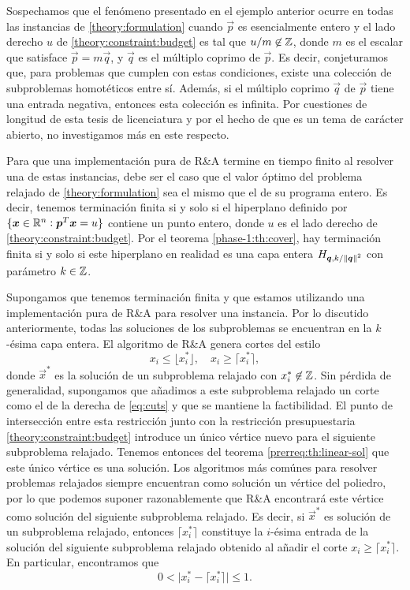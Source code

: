 Sospechamos que el fenómeno presentado en el ejemplo anterior ocurre en todas las instancias de
\eqref{theory:formulation} cuando $\vec{p}$ es esencialmente entero y el lado derecho $u$ de
\eqref{theory:constraint:budget} es tal que $u/m \not\in \mathbb{Z}$, donde $m$ es el escalar que satisface
$\vec{p} = m\vec{q}$, y $\vec{q}$ es el múltiplo coprimo de $\vec{p}$. Es decir, conjeturamos
que, para problemas que cumplen con estas condiciones, existe una colección de subproblemas
homotéticos entre sí. Además, si el múltiplo coprimo $\vec{q}$ de $\vec{p}$ tiene una entrada
negativa, entonces esta colección es infinita. Por cuestiones de longitud de esta tesis de
licenciatura y por el hecho de que es un tema de carácter abierto, no investigamos más en este
respecto.

Para que una implementación pura de R\&A termine en tiempo finito al resolver
una de estas instancias, debe ser el caso que el valor óptimo del problema relajado de
\eqref{theory:formulation} sea el mismo que el de su programa entero. Es decir, tenemos terminación
finita si y solo si el hiperplano definido por
	$\lbrace \boldsymbol{x} \in \mathbb{R}^n \vcentcolon \boldsymbol{p}^T\boldsymbol{x} = u \rbrace$
contiene un punto entero, donde $u$ es el lado derecho de \eqref{theory:constraint:budget}. Por el
teorema \ref{phase-1:th:cover}, hay terminación finita si y solo si este hiperplano en realidad es
una capa entera $H_{\boldsymbol{q}, k/\left\lVert \boldsymbol{q} \right\rVert^{2}}$ con parámetro $k \in \mathbb{Z}$.

Supongamos que tenemos terminación finita y que estamos utilizando una implementación pura de R\&A
para resolver una instancia. Por lo discutido anteriormente, todas las soluciones de los
subproblemas se encuentran en la $k$-ésima capa entera. El algoritmo de R\&A genera cortes del
estilo
\begin{equation}
	\label{eq:cuts}
	x_i \leq \big\lfloor x_i^* \big\rfloor,\quad x_i \geq \big\lceil x_i^* \big\rceil,
\end{equation}
donde $\vec{x}^*$ es la solución de un subproblema relajado con $x_i^* \not\in \mathbb{Z}$. Sin pérdida de
generalidad, supongamos que añadimos a este subproblema relajado un corte como el de la derecha de
\eqref{eq:cuts} y que se mantiene la factibilidad. El punto de intersección entre esta restricción
junto con la restricción presupuestaria \eqref{theory:constraint:budget} introduce un único vértice
nuevo para el siguiente subproblema relajado. Tenemos entonces del teorema
\ref{prerreq:th:linear-sol} que este único vértice es una solución. Los algoritmos más comúnes para
resolver problemas relajados siempre encuentran como solución un vértice del poliedro, por lo que
podemos suponer razonablemente que R\&A encontrará este vértice como solución del siguiente
subproblema relajado. Es decir, si $\vec{x}^*$ es solución de un subproblema relajado, entonces
$\big\lceil x_i^* \big\rceil$ constituye la $i$-ésima entrada de la solución del siguiente
subproblema relajado obtenido al añadir el corte $x_i \geq \big\lceil x_i^* \big\rceil$. En
particular, encontramos que
\begin{equation}
	\label{eq:dembound}
	0 <
	\big| x_i^* - \big\lceil x_i^* \big\rceil \big| \leq 1.
\end{equation}

